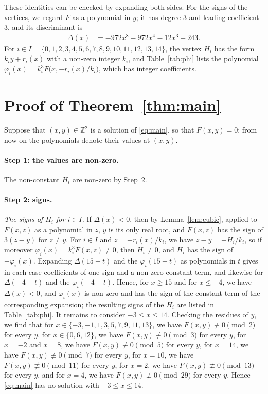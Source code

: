 \documentclass[11pt]{article}
\newcommand{\Z}{\mathbb{Z}}
\begin{document}
These identities can be checked by expanding both sides.
For the signs of the vertices, we regard $F$ as a polynomial in $y$; it has degree $3$ and leading coefficient $3$, and its discriminant is
\begin{align*}
\Delta(x)&=-972x^{8}-972x^{4}-12x^{3}-243.
\end{align*}
For $i\in I=\{0,\allowbreak 1,\allowbreak 2,\allowbreak 3,\allowbreak 4,\allowbreak 5,\allowbreak 6,\allowbreak 7,\allowbreak 8,\allowbreak 9,\allowbreak 10,\allowbreak 11,\allowbreak 12,\allowbreak 13,\allowbreak 14\}$, the vertex $H_i$ has the form $k_iy+r_i(x)$ with a non-zero integer $k_i$, and Table~\ref{tab:phi} lists the polynomial $\varphi_i(x)=k_i^3F\bigl(x,-r_i(x)/k_i\bigr)$, which has integer coefficients.

\section{Proof of Theorem~\ref{thm:main}}

Suppose that $(x,y)\in\Z^2$ is a solution of \eqref{eq:main}, so that $F(x,y)=0$; from now on the polynomials denote their values at $(x,y)$.
\paragraph{Step 1: the values are non-zero.} The non-constant $H_i$ are non-zero by Step~2.

\paragraph{Step 2: signs.} \emph{The signs of $H_i$ for $i\in I$.} If $\Delta(x)<0$, then by Lemma~\ref{lem:cubic}, applied to $F(x,z)$ as a polynomial in $z$, $y$ is its only real root, and $F(x,z)$ has the sign of $3(z-y)$ for $z\neq y$. For $i\in I$ and $z=-r_i(x)/k_i$, we have $z-y=-H_i/k_i$, so if moreover $\varphi_i(x)=k_i^3F(x,z)\neq0$, then $H_i\neq0$, and $H_i$ has the sign of $-\varphi_i(x)$. Expanding $\Delta(15+t)$ and the $\varphi_i(15+t)$ as polynomials in $t$ gives in each case coefficients of one sign and a non-zero constant term, and likewise for $\Delta(-4-t)$ and the $\varphi_i(-4-t)$. Hence, for $x\geq15$ and for $x\leq-4$, we have $\Delta(x)<0$, and $\varphi_i(x)$ is non-zero and has the sign of the constant term of the corresponding expansion; the resulting signs of the $H_i$ are listed in Table~\ref{tab:phi}. It remains to consider $-3\leq x\leq14$. Checking the residues of $y$, we find that for $x\in\{-3,\allowbreak -1,\allowbreak 1,\allowbreak 3,\allowbreak 5,\allowbreak 7,\allowbreak 9,\allowbreak 11,\allowbreak 13\}$, we have $F(x,y)\not\equiv0\pmod{2}$ for every $y$, for $x\in\{0,\allowbreak 6,\allowbreak 12\}$, we have $F(x,y)\not\equiv0\pmod{3}$ for every $y$, for $x=-2$ and $x=8$, we have $F(x,y)\not\equiv0\pmod{5}$ for every $y$, for $x=14$, we have $F(x,y)\not\equiv0\pmod{7}$ for every $y$, for $x=10$, we have $F(x,y)\not\equiv0\pmod{11}$ for every $y$, for $x=2$, we have $F(x,y)\not\equiv0\pmod{13}$ for every $y$, and for $x=4$, we have $F(x,y)\not\equiv0\pmod{29}$ for every $y$. Hence \eqref{eq:main} has no solution with $-3\leq x\leq14$.
\end{document}
